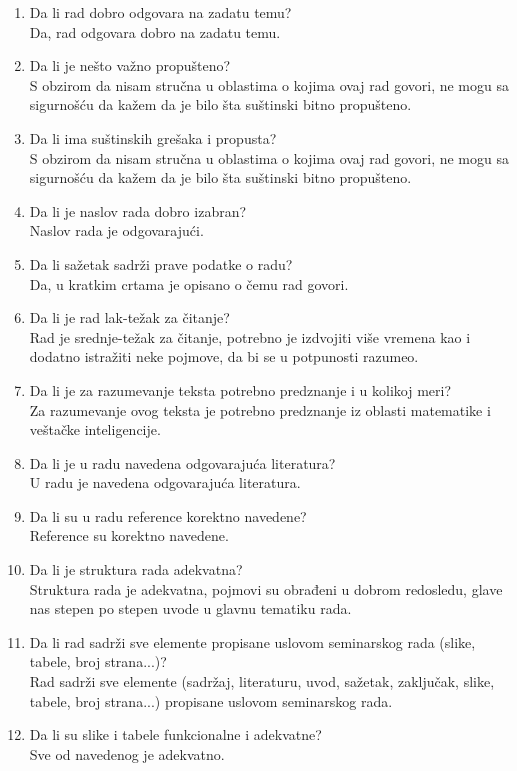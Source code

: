 \documentclass[a4paper]{report}
\begin{document}
\begin{enumerate}
\item Da li rad dobro odgovara na zadatu temu?\\
Da, rad odgovara dobro na zadatu temu.
\item Da li je nešto važno propušteno?\\
S obzirom da nisam stručna u oblastima o kojima ovaj rad govori, ne mogu sa sigurnošću da kažem da je bilo šta suštinski bitno propušteno.
\item Da li ima suštinskih grešaka i propusta?\\
S obzirom da nisam stručna u oblastima o kojima ovaj rad govori, ne mogu sa sigurnošću da kažem da je bilo šta suštinski bitno propušteno.
\item Da li je naslov rada dobro izabran?\\
Naslov rada je odgovarajući.
\item Da li sažetak sadrži prave podatke o radu?\\
Da, u kratkim crtama je opisano o čemu rad govori.
\item Da li je rad lak-težak za čitanje?\\
Rad je srednje-težak za čitanje, potrebno je izdvojiti više vremena kao i dodatno istražiti neke pojmove, da bi se u potpunosti razumeo.
\item Da li je za razumevanje teksta potrebno predznanje i u kolikoj meri?\\
Za razumevanje ovog teksta je potrebno predznanje iz oblasti matematike i veštačke inteligencije.
\item Da li je u radu navedena odgovarajuća literatura?\\
U radu je navedena odgovarajuća literatura.
\item Da li su u radu reference korektno navedene?\\
Reference su korektno navedene.
\item Da li je struktura rada adekvatna?\\
Struktura rada je adekvatna, pojmovi su obrađeni u dobrom redosledu, glave nas stepen po stepen uvode u glavnu tematiku rada.
\item Da li rad sadrži sve elemente propisane uslovom seminarskog rada (slike, tabele, broj strana...)?\\
Rad sadrži sve elemente (sadržaj, literaturu, uvod, sažetak, zaključak, slike, tabele, broj strana...) propisane uslovom seminarskog rada.
\item Da li su slike i tabele funkcionalne i adekvatne?\\
Sve od navedenog je adekvatno.
\end{enumerate}
\end{document}
